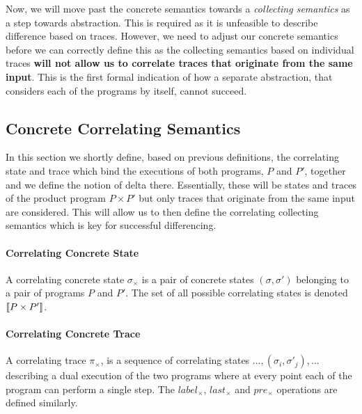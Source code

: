 Now, we will move past the concrete semantics towards a \emph{collecting semantics} as a step towards abstraction. This is required as it is unfeasible to describe difference based on traces. However, we need to adjust our concrete semantics before we can correctly define this as the collecting semantics based on individual traces \textbf{will not allow us to correlate traces that originate from the same input}. This is the first formal indication of how a separate abstraction, that considers each of the programs by itself, cannot succeed.

\subsection{Concrete Correlating Semantics} 

In this section we shortly define, based on previous definitions, the correlating state and trace which bind the executions of both programs, $P$ and $P'$, together and we define the notion of delta there. Essentially, these will be states and traces of the product program $P \times P'$ but only traces that originate from the same input are considered. This will allow us to then define the correlating collecting semantics which is key for successful differencing.

\paragraph{Correlating Concrete State} 
A correlating concrete state $\sigma_{\times}$ is a pair of concrete states $(\sigma,\sigma')$ belonging to a pair of programs $P$ and $P'$. The set of all possible correlating states is denoted $\lbrack\!\lbrack P \times P' \rbrack\!\rbrack$.

\paragraph{Correlating Concrete Trace} 
A correlating trace $\pi_{\times}$, is a sequence of correlating states $...,(\sigma_i,\sigma'_j),...$ describing a dual execution of the two programs where at every point each of the program can perform a single step. The $label_{\times}$, $last_{\times}$ and $pre_{\times}$ operations are defined similarly.

